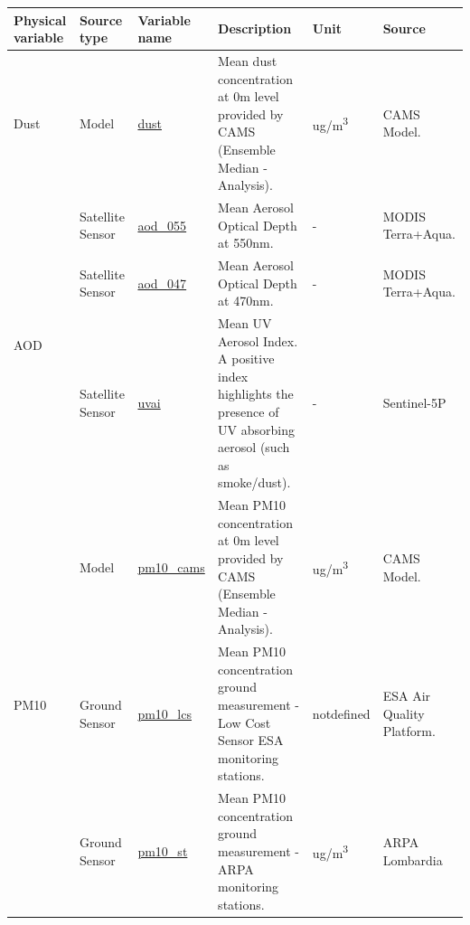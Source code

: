 \begin{center}
\setlength{\arrayrulewidth}{1.5pt}
\begin{longtable}{ |p{2cm}|p{1.5cm}|p{2.3cm}|p{4cm}|p{1cm}|p{2cm}| } 
\hline
\textbf{Physical variable} & \textbf{Source type}  & \textbf{Variable name}  & \textbf{Description}  & \textbf{Unit}  & \textbf{Source}\\ 
\hline
\multirow{1}{4em}{Dust} & Model  & \underline{dust} & Mean dust concentration at 0m level provided by CAMS (Ensemble Median - Analysis).\par & ug/m\textsuperscript{3} & CAMS Model.\\ \hline

\multirow{3}{4em}{AOD} & Satellite \newline Sensor  & \underline{aod\_055} & Mean Aerosol Optical Depth at 550nm.\par & - & MODIS Terra+Aqua.\\ 
& Satellite \newline Sensor  & \underline{aod\_047} &  Mean Aerosol Optical Depth at 470nm.\par & - & MODIS Terra+Aqua.\\ 
& Satellite \newline Sensor & \underline{uvai} &  Mean UV Aerosol Index. A positive index highlights the presence of UV absorbing aerosol (such as smoke/dust). \par & - & Sentinel-5P\\ \hline

\multirow{3}{4em}{PM10} & Model  & \underline{pm10\_cams} & Mean PM10 concentration at 0m level provided by CAMS  (Ensemble Median - Analysis).\par & ug/m\textsuperscript{3} & CAMS Model.\\ 
& Ground \newline Sensor  & \underline{pm10\_lcs} &  Mean PM10 concentration ground measurement - Low Cost Sensor ESA monitoring stations.\par & not\newline defined & ESA Air Quality Platform.\\ 
& Ground \newline Sensor & \underline{pm10\_st} &  Mean PM10 concentration ground measurement - ARPA monitoring stations. \par & ug/m\textsuperscript{3} & ARPA \newline Lombardia\\ \hline


\end{longtable}
\end{center}
